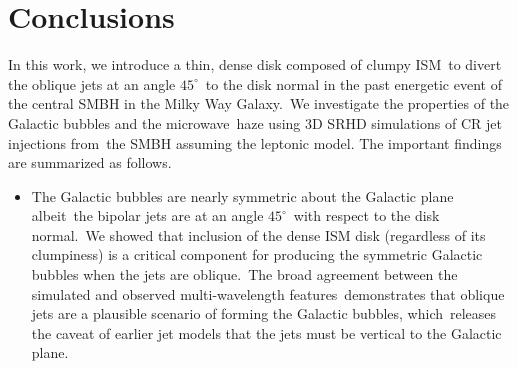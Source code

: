 \documentclass[fleqn,usenatbib,useAMS]{mnras}
\begin{document}
\section{Conclusions}
\label{Conclusions}
In this work, we introduce a thin, dense disk composed of clumpy ISM\
to divert the oblique jets at an angle $45^{\circ}$\
to the disk normal in the past energetic event of the central SMBH in the Milky Way Galaxy.\
We investigate the properties of the Galactic bubbles and the microwave\
haze using 3D SRHD simulations of CR jet injections from\
the SMBH assuming the leptonic model. The important findings are summarized as follows.

\begin{itemize}

\item The Galactic bubbles are nearly symmetric about the Galactic plane albeit\
      the bipolar jets are at an angle $45^{\circ}$\
      with respect to the disk normal.\
      We showed that inclusion of the dense ISM disk (regardless of its clumpiness) is a critical component for producing the symmetric Galactic bubbles when the jets are oblique.\
      The broad agreement between the simulated and observed multi-wavelength features\
      demonstrates that oblique jets are a plausible scenario of forming the Galactic bubbles, which\
      releases the caveat of earlier jet models that the jets must be vertical to the Galactic plane.\



\end{itemize}
\end{document}
